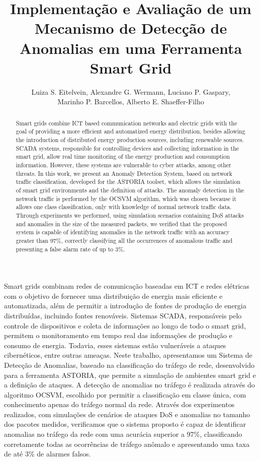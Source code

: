 \documentclass[12pt]{article}
\title{Implementação e Avaliação de um Mecanismo de Detecção de Anomalias em uma Ferramenta Smart Grid}
\author{Luiza S. Eitelvein\inst{1}, Alexandre G. Wermann\inst{1}, Luciano P. Gaspary\inst{1},\\
 Marinho P. Barcellos\inst{1}, Alberto E. Shaeffer-Filho\inst{1}}
\begin{document}
 

\maketitle

\begin{abstract}
Smart grids combine ICT based communication networks and electric grids with the goal of providing a more efficient and automatized energy distribution, besides allowing the introduction of distributed energy production sources, including renewable sources. SCADA systems, responsible for controlling devices and collecting information in the smart grid, allow real time monitoring of the energy production and consumption information. However, these systems are vulnerable to cyber attacks, among other threats. In this work, we present an Anomaly Detection System, based on network traffic classification, developed for the ASTORIA toolset, which allows the simulation of smart grid environments and the definition of attacks. The anomaly detection in the network traffic is performed by the OCSVM algorithm, which was chosen because it allows one class classification, only with knowledge of normal network traffic data. Through experiments we performed, using simulation scenarios containing DoS attacks and anomalies in the size of the measured packets, we verified that the proposed system is capable of identifying anomalies in the network traffic with an accuracy greater than 97\%, correctly classifying all the occurrences of anomalous traffic and presenting a false alarm rate of up to 3\%.
\end{abstract}

\begin{resumo}
Smart grids combinam redes de comunicação baseadas em ICT e redes elétricas com o objetivo de fornecer uma distribuição de energia mais eficiente e automatizada, além de permitir a introdução de fontes de produção de energia distribuídas, incluindo fontes renováveis. Sistemas SCADA, responsáveis pelo controle de dispositivos e coleta de informações ao longo de todo o smart grid, permitem o monitoramento em tempo real das informações de produção e consumo de energia. Todavia, esses sistemas estão vulneráveis a ataques cibernéticos, entre outras ameaças. Neste trabalho, apresentamos um Sistema de Detecção de Anomalias, baseado na classificação do tráfego de rede, desenvolvido para a ferramenta ASTORIA, que permite a simulação de ambientes smart grid e a definição de ataques. A detecção de anomalias no tráfego é realizada através do algoritmo OCSVM, escolhido por permitir a classificação em classe única, com conhecimento apenas do tráfego normal da rede. Através dos experimentos realizados, com simulações de cenários de ataques DoS e anomalias no tamanho dos pacotes medidos, verificamos que o sistema proposto é capaz de identificar anomalias no tráfego da rede com uma acurácia superior a 97\%, classificando corretamente todas as ocorrências de tráfego anômalo e apresentando uma taxa de até 3\% de alarmes falsos.
\end{resumo}
\end{document}
